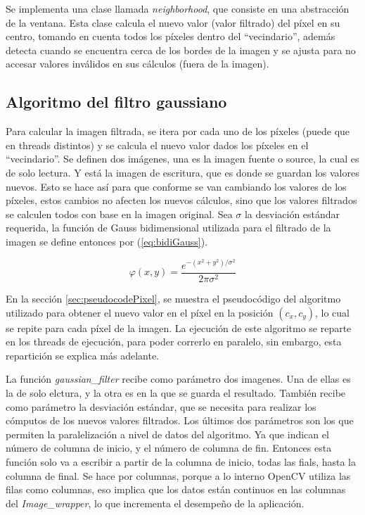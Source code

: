 \documentclass {article}
\begin{document}
Se implementa una clase llamada \textit{neighborhood}, que consiste en una abstracción de la
ventana. Esta clase calcula el nuevo valor (valor filtrado) del píxel en su centro, tomando en
cuenta todos los píxeles dentro del ``vecindario'', además detecta cuando se encuentra cerca de los
bordes de la imagen y se ajusta para no accesar valores inválidos en sus cálculos (fuera de la
imagen).

\subsection{Algoritmo del filtro gaussiano}

Para calcular la imagen filtrada, se itera por cada uno de los píxeles (puede que en threads
distintos) y se calcula el nuevo valor dados los píxeles en el ``vecindario''. Se definen dos
imágenes, una es la imagen fuente o source, la cual es de solo lectura. Y está la imagen de
escritura, que es donde se guardan los valores nuevos. Esto se hace así para que conforme se van
cambiando los valores de los píxeles, estos cambios no afecten los nuevos cálculos, sino que los
valores filtrados se calculen todos con base en la imagen original. Sea $\sigma$ la desviación
estándar requerida, la función de Gauss bidimensional utilizada para el filtrado de la imagen se
define entonces por (\ref{eq:bidiGauss}).

\begin{equation}
  \varphi (x, y)= \frac{e^{-(x^2+y^2)/\sigma^2}}{2\pi \sigma^2} 
  \label{eq:bidiGauss}
\end{equation}

En la sección \ref{sec:pseudocodePixel}, se muestra el pseudocódigo del algoritmo utilizado para
obtener el nuevo valor en el píxel en la posición $(c_x, c_y)$, lo cual se repite para cada píxel de
la imagen. La ejecución de este algoritmo se reparte en los threads de ejecución, para poder
correrlo en paralelo, sin embargo, esta repartición se explica más adelante.

La función \textit{gaussian\_filter} recibe como parámetro dos imagenes. Una de ellas es la de solo
elctura, y la otra es en la que se guarda el resultado. También recibe como parámetro la desviación
estándar, que se necesita para realizar los cómputos de los nuevos valores filtrados. Los últimos
dos parámetros son los que permiten la paralelización a nivel de datos del algoritmo. Ya que indican
el número de columna de inicio, y el número de columna de fin. Entonces esta función solo va a
escribir a partir de la columna de inicio, todas las fials, hasta la columna de final. Se hace por
columnas, porque a lo interno OpenCV utiliza las filas como columnas, eso implica que los datos
están continuos en las columnas del \textit{Image\_wrapper}, lo que incrementa el desempeño de la
aplicación.  
\end{document}
